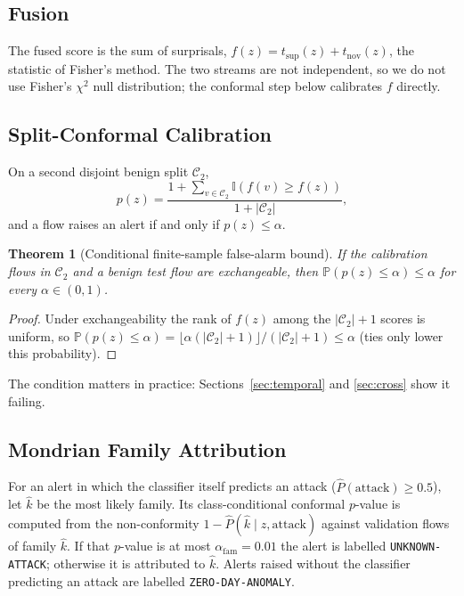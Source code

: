 \documentclass[conference]{IEEEtran}
\newtheorem{theorem}{Theorem}
\begin{document}
\subsection{Fusion}
The fused score is the sum of surprisals, $f(z)=t_{\text{sup}}(z)+t_{\text{nov}}(z)$, the statistic of Fisher's method. The two streams are not independent, so we do not use Fisher's $\chi^2$ null distribution; the conformal step below calibrates $f$ directly.

\subsection{Split-Conformal Calibration}
On a second disjoint benign split $\mathcal{C}_2$,
\begin{equation}
p(z) = \frac{1+\sum_{v\in\mathcal{C}_2}\mathbb{I}(f(v)\ge f(z))}{1+|\mathcal{C}_2|},
\end{equation}
and a flow raises an alert if and only if $p(z)\le\alpha$.

\begin{theorem}[Conditional finite-sample false-alarm bound]
If the calibration flows in $\mathcal{C}_2$ and a benign test flow are exchangeable, then $\mathbb{P}(p(z)\le\alpha)\le\alpha$ for every $\alpha\in(0,1)$.
\end{theorem}
\begin{proof}
Under exchangeability the rank of $f(z)$ among the $|\mathcal{C}_2|+1$ scores is uniform, so $\mathbb{P}(p(z)\le\alpha) = \lfloor\alpha(|\mathcal{C}_2|+1)\rfloor/(|\mathcal{C}_2|+1)\le\alpha$ (ties only lower this probability).
\end{proof}
The condition matters in practice: Sections~\ref{sec:temporal} and \ref{sec:cross} show it failing.

\subsection{Mondrian Family Attribution}
For an alert in which the classifier itself predicts an attack ($\hat{P}(\text{attack})\ge 0.5$), let $\hat{k}$ be the most likely family. Its class-conditional conformal $p$-value is computed from the non-conformity $1-\hat{P}(\hat{k}\mid z,\text{attack})$ against validation flows of family $\hat{k}$. If that $p$-value is at most $\alpha_{\text{fam}}=0.01$ the alert is labelled \texttt{UNKNOWN-ATTACK}; otherwise it is attributed to $\hat{k}$. Alerts raised without the classifier predicting an attack are labelled \texttt{ZERO-DAY-ANOMALY}.
\end{document}
